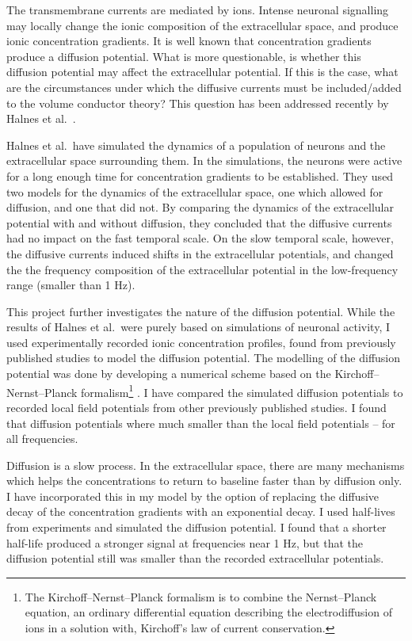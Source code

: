 \documentclass{uiophd}
\begin{document}
The transmembrane currents are mediated by ions. Intense neuronal signalling may locally change the ionic composition of the extracellular space, and produce ionic concentration gradients. It is well known that concentration gradients produce a diffusion potential. What is more questionable, is whether this diffusion potential may affect the extracellular potential. If this is the case, what are the circumstances under which the diffusive currents must be included/added to the volume conductor theory? This question has been addressed recently by Halnes et al.\ \cite{Halnes2016}. 

Halnes et al.\ have simulated the dynamics of a population of neurons and the extracellular space surrounding them. In the simulations, the neurons were active for a long enough time for concentration gradients to be established. They used two models for the dynamics of the extracellular space, one which allowed for diffusion, and one that did not. By comparing the dynamics of the extracellular potential with and without diffusion, they concluded that the diffusive currents had no impact on the fast temporal scale. On the slow temporal scale, however, the diffusive currents induced shifts in the extracellular potentials, and changed the the frequency composition of the extracellular potential in the low-frequency range (smaller than 1 Hz).


This project further investigates the nature of the diffusion potential. While the results of Halnes et al.\ were purely based on simulations of neuronal activity, I used experimentally recorded ionic concentration profiles, found from previously published studies to model the diffusion potential. The modelling of the diffusion potential was done by developing a numerical scheme based on the Kirchoff--Nernst--Planck formalism\footnote{The Kirchoff--Nernst--Planck formalism is to combine the Nernst--Planck equation, an ordinary differential equation describing the electrodiffusion of ions in a solution with, Kirchoff's law of current conservation.} \cite{Halnes2013}\cite{Halnes2016}.  I have compared the simulated diffusion potentials to recorded local field potentials from other previously published studies. I found that diffusion potentials where much smaller than the local field potentials -- for all frequencies. 

Diffusion is a slow process. In the extracellular space, there are many mechanisms which helps the concentrations to return to baseline faster than by diffusion only. I have incorporated this in my model by the option of replacing the diffusive decay of the concentration gradients with an exponential decay. I used half-lives from experiments and simulated the diffusion potential. I found that a shorter half-life produced a stronger signal at frequencies near 1 Hz, but that the diffusion potential still was smaller than the recorded extracellular potentials. 
\end{document}
